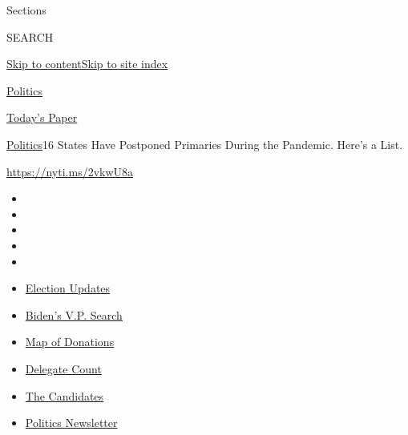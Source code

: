 Sections

SEARCH

\protect\hyperlink{site-content}{Skip to
content}\protect\hyperlink{site-index}{Skip to site index}

\href{https://www.nytimes.com/section/politics}{Politics}

\href{https://myaccount.nytimes.com/auth/login?response_type=cookie\&client_id=vi}{}

\href{https://www.nytimes.com/section/todayspaper}{Today's Paper}

\href{/section/politics}{Politics}\textbar{}16 States Have Postponed
Primaries During the Pandemic. Here's a List.

\url{https://nyti.ms/2vkwU8a}

\begin{itemize}
\item
\item
\item
\item
\item
\end{itemize}

\begin{itemize}
\item
  \href{https://www.nytimes.com/2020/07/31/us/elections/biden-vs-trump.html?action=click\&pgtype=Article\&state=default\&region=TOP_BANNER\&context=storylines_menu}{Election
  Updates}
\item
  \href{https://www.nytimes.com/article/biden-vice-president-2020.html?action=click\&pgtype=Article\&state=default\&region=TOP_BANNER\&context=storylines_menu}{Biden's
  V.P. Search}
\item
  \href{https://www.nytimes.com/interactive/2020/07/24/us/politics/trump-biden-campaign-donors.html?action=click\&pgtype=Article\&state=default\&region=TOP_BANNER\&context=storylines_menu}{Map
  of Donations}
\item
  \href{https://www.nytimes.com/interactive/2020/us/elections/delegate-count-primary-results.html?action=click\&pgtype=Article\&state=default\&region=TOP_BANNER\&context=storylines_menu}{Delegate
  Count}
\item
  \href{https://www.nytimes.com/interactive/2019/us/politics/2020-presidential-candidates.html?action=click\&pgtype=Article\&state=default\&region=TOP_BANNER\&context=storylines_menu}{The
  Candidates}
\item
  \href{https://www.nytimes.com/newsletters/politics?action=click\&pgtype=Article\&state=default\&region=TOP_BANNER\&context=storylines_menu}{Politics
  Newsletter}
\end{itemize}

